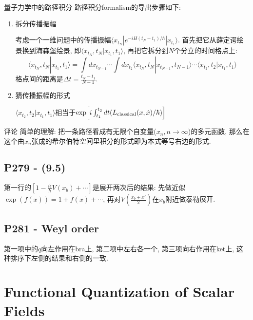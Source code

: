 \begin{mybox}{量子力学中的路径积分}
  路径积分formalism的导出步骤如下:
  \begin{enumerate}
    \item 拆分传播振幅

          考虑一个一维问题中的传播振幅$\langle x_{t_N}|e^{-iH(t_N-t_1)/\hbar}|x_{t_1} \rangle$.
          首先把它从薛定谔绘景换到海森堡绘景, 即$\langle x_{t_N}, t_N|x_{t_1}, t_1 \rangle$, 再把它拆分到$N$个分立的时间格点上:
          \begin{equation*}
            \langle x_{t_N}, t_N|x_{t_1}, t_1 \rangle = \int dx_{t_{N-1}} \cdots \int dx_{t_2} \langle x_{t_N}, t_N|x_{t_{N-1}}, t_{N-1} \rangle \cdots \langle x_{t_2}, t_2|x_{t_1}, t_1 \rangle
          \end{equation*}
          格点间的距离是$\Delta t = \frac{t_N-t_1}{N-1}$.
    \item 猜传播振幅的形式
    
    $\langle x_{t_2}, t_2|x_{t_1}, t_1 \rangle$相当于$\exp\Bigl[i\int_{t_1}^{t_2}dt (L_\text{classical}(x, \dot{x})/\hbar)\Bigr]$
  \end{enumerate}
\end{mybox}

\begin{mybox}{评论}
  简单的理解: 把一条路径看成有无限个自变量($x_n, n \rightarrow \infty$)的多元函数, 那么在这个由$x_n$张成的希尔伯特空间里积分的形式即为本式等号右边的形式.
\end{mybox}

\subsection{P279 - (9.5)}

第一行的$[1-\frac{i\epsilon}{\hbar}V(x_b)+\cdots]$是展开两次后的结果: 先做近似$\exp(f(x)) = 1 + f(x) + \cdots$, 再对$V(\frac{x_b + x'}{2})$在$x_b$附近做泰勒展开.

\subsection{P281 - Weyl order}

第一项中的$q$向左作用在bra上, 第二项中左右各一个, 第三项向右作用在ket上, 这种排序下左侧的结果和右侧的一致.

\section{Functional Quantization of Scalar Fields}

